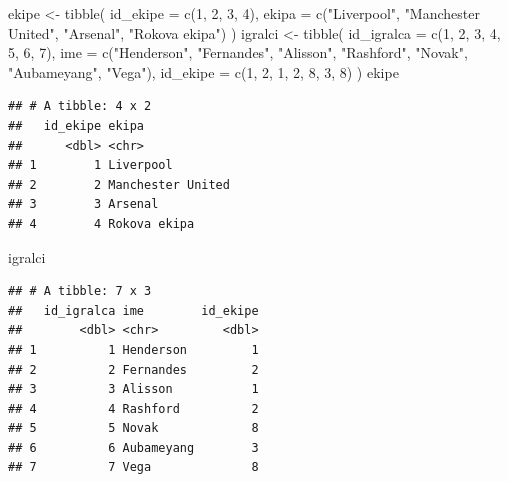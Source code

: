 \documentclass[
]{book}
\newenvironment{Shaded}{\begin{snugshade}}{\end{snugshade}}
\newcommand{\AttributeTok}[1]{\textcolor[rgb]{0.77,0.63,0.00}{#1}}
\newcommand{\DecValTok}[1]{\textcolor[rgb]{0.00,0.00,0.81}{#1}}
\newcommand{\FunctionTok}[1]{\textcolor[rgb]{0.00,0.00,0.00}{#1}}
\newcommand{\NormalTok}[1]{#1}
\newcommand{\OtherTok}[1]{\textcolor[rgb]{0.56,0.35,0.01}{#1}}
\newcommand{\StringTok}[1]{\textcolor[rgb]{0.31,0.60,0.02}{#1}}
\begin{document}
\begin{Shaded}
\begin{Highlighting}[]
\NormalTok{ekipe }\OtherTok{\textless{}{-}} \FunctionTok{tibble}\NormalTok{(}
  \AttributeTok{id\_ekipe =} \FunctionTok{c}\NormalTok{(}\DecValTok{1}\NormalTok{, }\DecValTok{2}\NormalTok{, }\DecValTok{3}\NormalTok{, }\DecValTok{4}\NormalTok{),}
  \AttributeTok{ekipa =} \FunctionTok{c}\NormalTok{(}\StringTok{"Liverpool"}\NormalTok{, }\StringTok{"Manchester United"}\NormalTok{, }\StringTok{"Arsenal"}\NormalTok{, }\StringTok{"Rokova ekipa"}\NormalTok{)}
\NormalTok{)}
\NormalTok{igralci }\OtherTok{\textless{}{-}} \FunctionTok{tibble}\NormalTok{(}
  \AttributeTok{id\_igralca =} \FunctionTok{c}\NormalTok{(}\DecValTok{1}\NormalTok{, }\DecValTok{2}\NormalTok{, }\DecValTok{3}\NormalTok{, }\DecValTok{4}\NormalTok{, }\DecValTok{5}\NormalTok{, }\DecValTok{6}\NormalTok{, }\DecValTok{7}\NormalTok{),}
  \AttributeTok{ime =} \FunctionTok{c}\NormalTok{(}\StringTok{"Henderson"}\NormalTok{, }\StringTok{"Fernandes"}\NormalTok{, }\StringTok{"Alisson"}\NormalTok{, }\StringTok{"Rashford"}\NormalTok{, }\StringTok{"Novak"}\NormalTok{, }\StringTok{"Aubameyang"}\NormalTok{, }\StringTok{"Vega"}\NormalTok{),}
  \AttributeTok{id\_ekipe =} \FunctionTok{c}\NormalTok{(}\DecValTok{1}\NormalTok{, }\DecValTok{2}\NormalTok{, }\DecValTok{1}\NormalTok{, }\DecValTok{2}\NormalTok{, }\DecValTok{8}\NormalTok{, }\DecValTok{3}\NormalTok{, }\DecValTok{8}\NormalTok{)}
\NormalTok{)}
\NormalTok{ekipe}
\end{Highlighting}
\end{Shaded}

\begin{verbatim}
## # A tibble: 4 x 2
##   id_ekipe ekipa            
##      <dbl> <chr>            
## 1        1 Liverpool        
## 2        2 Manchester United
## 3        3 Arsenal          
## 4        4 Rokova ekipa
\end{verbatim}

\begin{Shaded}
\begin{Highlighting}[]
\NormalTok{igralci}
\end{Highlighting}
\end{Shaded}

\begin{verbatim}
## # A tibble: 7 x 3
##   id_igralca ime        id_ekipe
##        <dbl> <chr>         <dbl>
## 1          1 Henderson         1
## 2          2 Fernandes         2
## 3          3 Alisson           1
## 4          4 Rashford          2
## 5          5 Novak             8
## 6          6 Aubameyang        3
## 7          7 Vega              8
\end{verbatim}
\end{document}
